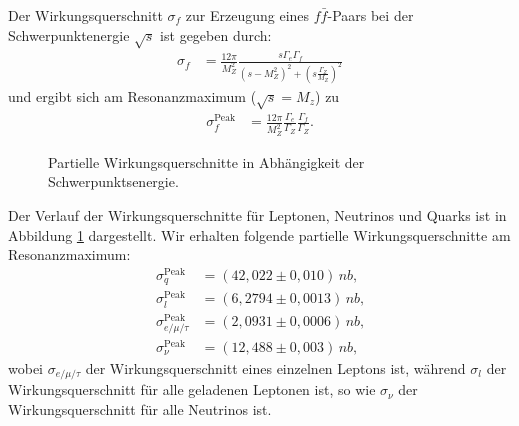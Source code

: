 Der Wirkungsquerschnitt $\sigma_f$ zur Erzeugung eines $f\bar{f}$-Paars bei der Schwerpunktenergie $\sqrt{s}$ ist gegeben durch:
\begin{align}
	\sigma_f&=\frac{12\pi}{M_Z^2}\frac{s\Gamma_e\Gamma_f}{\left(s-M_Z^2\right)^2+\left(s\frac{\Gamma_Z}{M_Z}\right)^2}
\end{align}
und ergibt sich am Resonanzmaximum ($\sqrt{s}=M_z$) zu
\begin{align}
	\sigma_f^\text{Peak}&=\frac{12\pi}{M_Z^2}\frac{\Gamma_e}{\Gamma_Z}\frac{\Gamma_f}{\Gamma_Z}\text{.}
\end{align}

\begin{figure}
	\centering
	\caption[Partielle Wirkungsquerschnitte in Abhängigkeit der Schwerpunktsenergie]{Partielle Wirkungsquerschnitte in Abhängigkeit der Schwerpunktsenergie.}
	\label{fig:partialbreiten}
\end{figure}

Der Verlauf der Wirkungsquerschnitte für Leptonen, Neutrinos und Quarks ist in Abbildung \ref{fig:partialbreiten} dargestellt. Wir erhalten folgende partielle Wirkungsquerschnitte am Resonanzmaximum:
\begin{align}
	\sigma_q^\text{Peak}&=(42,022\pm0,010)\,\si{nb}\text{,}\\
	\sigma_l^\text{Peak}&=(6,2794\pm0,0013)\,\si{nb}\text{,}\\
	\sigma_{e/\mu/\tau}^\text{Peak}&=(2,0931\pm0,0006)\,\si{nb}\text{,}\\
	\sigma_\nu^\text{Peak}&=(12,488\pm0,003)\,\si{nb}\text{,}
\end{align}
wobei $\sigma_{e/\mu/\tau}$ der Wirkungsquerschnitt eines einzelnen Leptons ist, während $\sigma_{l}$ der Wirkungsquerschnitt für alle geladenen Leptonen ist, so wie $\sigma_\nu$ der Wirkungsquerschnitt für alle Neutrinos ist.

